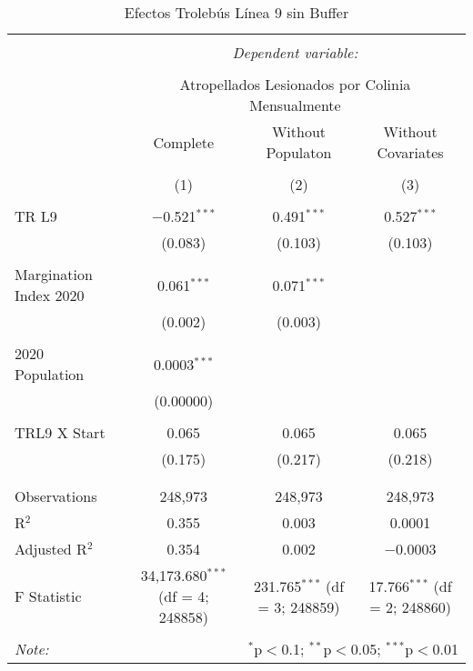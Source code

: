 
\begin{table}[!htbp] \centering 
  \caption{Efectos Trolebús Línea 9 sin Buffer} 
  \label{} 
\begin{tabular}{@{\extracolsep{5pt}}lccc} 
\\[-1.8ex]\hline 
\hline \\[-1.8ex] 
 & \multicolumn{3}{c}{\textit{Dependent variable:}} \\ 
\cline{2-4} 
\\[-1.8ex] & \multicolumn{3}{c}{Atropellados Lesionados por Colinia Mensualmente} \\ 
 & Complete & Without Populaton & Without Covariates \\ 
\\[-1.8ex] & (1) & (2) & (3)\\ 
\hline \\[-1.8ex] 
 TR L9 & $-$0.521$^{***}$ & 0.491$^{***}$ & 0.527$^{***}$ \\ 
  & (0.083) & (0.103) & (0.103) \\ 
  & & & \\ 
 Margination Index 2020 & 0.061$^{***}$ & 0.071$^{***}$ &  \\ 
  & (0.002) & (0.003) &  \\ 
  & & & \\ 
 2020 Population & 0.0003$^{***}$ &  &  \\ 
  & (0.00000) &  &  \\ 
  & & & \\ 
 TRL9 X Start & 0.065 & 0.065 & 0.065 \\ 
  & (0.175) & (0.217) & (0.218) \\ 
  & & & \\ 
\hline \\[-1.8ex] 
Observations & 248,973 & 248,973 & 248,973 \\ 
R$^{2}$ & 0.355 & 0.003 & 0.0001 \\ 
Adjusted R$^{2}$ & 0.354 & 0.002 & $-$0.0003 \\ 
F Statistic & 34,173.680$^{***}$ (df = 4; 248858) & 231.765$^{***}$ (df = 3; 248859) & 17.766$^{***}$ (df = 2; 248860) \\ 
\hline 
\hline \\[-1.8ex] 
\textit{Note:}  & \multicolumn{3}{r}{$^{*}$p$<$0.1; $^{**}$p$<$0.05; $^{***}$p$<$0.01} \\ 
\end{tabular} 
\end{table} 
